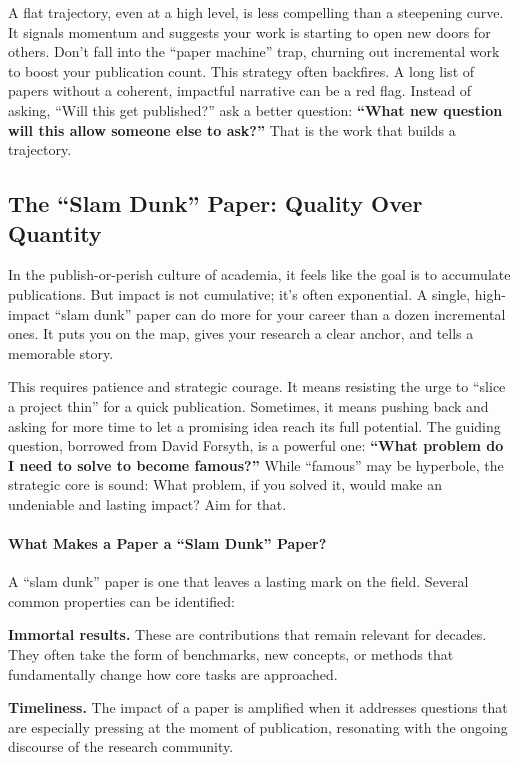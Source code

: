 A flat trajectory, even at a high level, is less compelling than a steepening curve.
It signals momentum and suggests your work is starting to open new doors for others.
Don't fall into the ``paper machine'' trap, churning out incremental work to boost your publication count.
This strategy often backfires.
A long list of papers without a coherent, impactful narrative can be a red flag.
Instead of asking, ``Will this get published?'' ask a better question: \textbf{``What new question will this allow someone else to ask?''}
That is the work that builds a trajectory.

\subsection{The ``Slam Dunk'' Paper: Quality Over Quantity}

In the publish-or-perish culture of academia, it feels like the goal is to accumulate publications.
But impact is not cumulative; it's often exponential.
A single, high-impact ``slam dunk'' paper can do more for your career than a dozen incremental ones.
It puts you on the map, gives your research a clear anchor, and tells a memorable story.

This requires patience and strategic courage.
It means resisting the urge to ``slice a project thin'' for a quick publication.
Sometimes, it means pushing back and asking for more time to let a promising idea reach its full potential.
The guiding question, borrowed from David Forsyth, is a powerful one: \textbf{``What problem do I need to solve to become famous?''}
While ``famous'' may be hyperbole, the strategic core is sound: What problem, if you solved it, would make an undeniable and lasting impact?
Aim for that.

\paragraph{What Makes a Paper a ``Slam Dunk'' Paper?}

A ``slam dunk'' paper is one that leaves a lasting mark on the field.
Several common properties can be identified:

\textbf{Immortal results.} These are contributions that remain relevant for decades.
They often take the form of benchmarks, new concepts, or methods that fundamentally change how core tasks are approached.

\textbf{Timeliness.} The impact of a paper is amplified when it addresses questions that are especially pressing at the moment of publication, resonating with the ongoing discourse of the research community.

